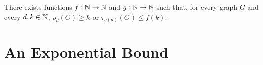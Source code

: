 \documentclass{patmorin}
\renewcommand{\ge}{\geqslant}
\renewcommand{\le}{\leqslant}
\DeclareMathOperator{\girth}{girth}
\DeclareMathOperator{\dist}{dist}
\begin{document}
\begin{conj}
  There exists functions $f:\mathbb{N}\to\mathbb{N}$ and $g:\mathbb{N}\to\mathbb{N}$ such that, for every graph $G$ and every $d,k\in\mathbb{N}$, $\rho_d(G) \ge k$ or $\tau_{g(d)}(G)\le f(k)$.
\end{conj}


\section{An Exponential Bound}


%
%
%
\end{document}
